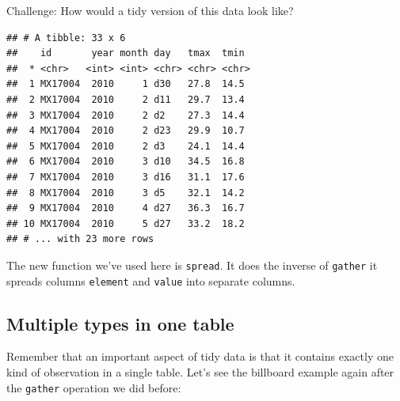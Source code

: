 \documentclass[12pt,]{book}
\newenvironment{Shaded}{\begin{snugshade}}{\end{snugshade}}
\newcommand{\KeywordTok}[1]{\textcolor[rgb]{0.13,0.29,0.53}{\textbf{#1}}}
\newcommand{\DataTypeTok}[1]{\textcolor[rgb]{0.13,0.29,0.53}{#1}}
\newcommand{\StringTok}[1]{\textcolor[rgb]{0.31,0.60,0.02}{#1}}
\newcommand{\OtherTok}[1]{\textcolor[rgb]{0.56,0.35,0.01}{#1}}
\newcommand{\OperatorTok}[1]{\textcolor[rgb]{0.81,0.36,0.00}{\textbf{#1}}}
\newcommand{\NormalTok}[1]{#1}
\theoremstyle{definition}
\theoremstyle{definition}
\theoremstyle{definition}
\theoremstyle{remark}
\begin{document}
Challenge: How would a tidy version of this data look like?

\begin{Shaded}
\end{Shaded}

\begin{verbatim}
## # A tibble: 33 x 6
##    id       year month day   tmax  tmin 
##  * <chr>   <int> <int> <chr> <chr> <chr>
##  1 MX17004  2010     1 d30   27.8  14.5 
##  2 MX17004  2010     2 d11   29.7  13.4 
##  3 MX17004  2010     2 d2    27.3  14.4 
##  4 MX17004  2010     2 d23   29.9  10.7 
##  5 MX17004  2010     2 d3    24.1  14.4 
##  6 MX17004  2010     3 d10   34.5  16.8 
##  7 MX17004  2010     3 d16   31.1  17.6 
##  8 MX17004  2010     3 d5    32.1  14.2 
##  9 MX17004  2010     4 d27   36.3  16.7 
## 10 MX17004  2010     5 d27   33.2  18.2 
## # ... with 23 more rows
\end{verbatim}

The new function we've used here is \texttt{spread}. It does the inverse
of \texttt{gather} it spreads columns \texttt{element} and
\texttt{value} into separate columns.

\subsection{Multiple types in one
table}\label{multiple-types-in-one-table}

Remember that an important aspect of tidy data is that it contains
exactly one kind of observation in a single table. Let's see the
billboard example again after the \texttt{gather} operation we did
before:

\begin{Shaded}
\end{Shaded}
\end{document}

